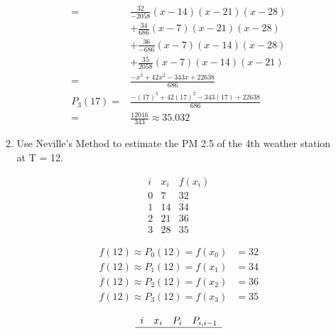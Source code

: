 \documentclass{exam}
\begin{document}
\begin{enumerate}
\begin{enumerate}
\begin{align*}
                    =& \frac{32}{-2058}(x-14)(x-21)(x-28)\\
                    &   + \frac{34}{686}(x-7)(x-21)(x-28)\\
                    &  + \frac{36}{-686}(x-7)(x-14)(x-28)\\
                    &   + \frac{35}{2058}(x-7)(x-14)(x-21)\\
                    =& \frac{-x^3+42x^2-343x+22638}{686}\\
            P_3(17) =& \frac{-(17)^3+42(17)^2-343(17)+22638}{686}\\
                    =& \frac{12016}{343} \approx \mathbf{35.032}
        \end{align*}
        \newpage
        \item Use  Neville's  Method  to  estimate  the  PM  2.5  of  the  4th weather station at T = 12.
        \newline
        \begin{minipage}{0.3\textwidth}
            \begin{equation*}
                \begin{array}{ccc}
                    i & x_i & f(x_i)\\\hline
                    0 & 7   & 32\\
                    1 & 14  & 34\\
                    2 & 21  & 36\\
                    3 & 28  & 35
                \end{array}
            \end{equation*}
        \end{minipage}
        \begin{minipage}{0.7\textwidth} 
            \begin{align*}
                f(12) \approx P_0(12) = f(x_0) &= 32\\
                f(12) \approx P_1(12) = f(x_1) &= 34\\
                f(12) \approx P_2(12) = f(x_2) &= 36\\
                f(12) \approx P_3(12) = f(x_3) &= 35
            \end{align*}
        \end{minipage}
        \begin{minipage}{0.2\textwidth}
            \begin{equation*}
            \begin{array}{cccc}
                i & x_i & P_i& P_{i,i-1}\\\hline

\end{array}
\end{equation*}
\end{minipage}
\end{enumerate}
\end{enumerate}
\end{document}
